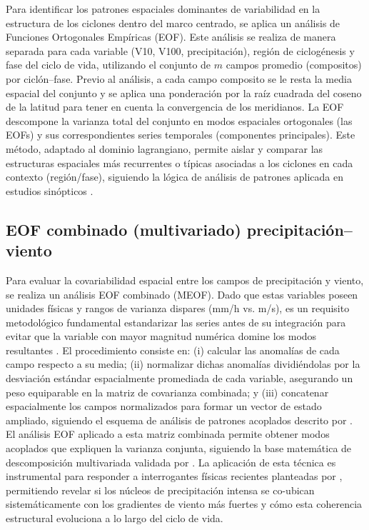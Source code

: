 Para identificar los patrones espaciales dominantes de variabilidad en la estructura de los ciclones dentro del marco centrado, se aplica un análisis de Funciones Ortogonales Empíricas (EOF). Este análisis se realiza de manera separada para cada variable (V10, V100, precipitación), región de ciclogénesis y fase del ciclo de vida, utilizando el conjunto de $m$ campos promedio (compositos) por ciclón--fase. Previo al análisis, a cada campo composito se le resta la media espacial del conjunto y se aplica una ponderación por la raíz cuadrada del coseno de la latitud para tener en cuenta la convergencia de los meridianos. La EOF descompone la varianza total del conjunto en modos espaciales ortogonales (las EOFs) y sus correspondientes series temporales (componentes principales). Este método, adaptado al dominio lagrangiano, permite aislar y comparar las estructuras espaciales más recurrentes o típicas asociadas a los ciclones en cada contexto (región/fase), siguiendo la lógica de análisis de patrones aplicada en estudios sinópticos \citep{vera2002cold}.

\subsection{EOF combinado (multivariado) precipitación--viento}\label{subsec:eof_multivariado}

Para evaluar la covariabilidad espacial entre los campos de precipitación y viento, se realiza un análisis EOF combinado (MEOF). Dado que estas variables poseen unidades físicas y rangos de varianza dispares (mm/h vs. m/s), es un requisito metodológico fundamental estandarizar las series antes de su integración para evitar que la variable con mayor magnitud numérica domine los modos resultantes \citep{wilks2019statistical}. El procedimiento consiste en: (i) calcular las anomalías de cada campo respecto a su media; (ii) normalizar dichas anomalías dividiéndolas por la desviación estándar espacialmente promediada de cada variable, asegurando un peso equiparable en la matriz de covarianza combinada; y (iii) concatenar espacialmente los campos normalizados para formar un vector de estado ampliado, siguiendo el esquema de análisis de patrones acoplados descrito por \citet{bretherton1992intercomparison}. El análisis EOF aplicado a esta matriz combinada permite obtener modos acoplados que expliquen la varianza conjunta, siguiendo la base matemática de descomposición multivariada validada por \citet{liang2018multivariate}. La aplicación de esta técnica es instrumental para responder a interrogantes físicas recientes planteadas por \citet{sinclair2023relationship}, permitiendo revelar si los núcleos de precipitación intensa se co-ubican sistemáticamente con los gradientes de viento más fuertes y cómo esta coherencia estructural evoluciona a lo largo del ciclo de vida.